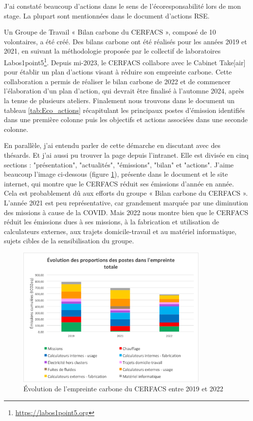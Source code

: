     J'ai constaté beaucoup d'actions dans le sens de l'écoresponsabilité lors de mon stage. La plupart sont mentionnées dans le document d'actions RSE.
    \vspace{0,5cm}

    Un Groupe de Travail « Bilan carbone du CERFACS », composé de 10 volontaires, a été créé. Des bilans carbone ont été réalisés pour les années 2019 et 2021, en suivant la méthodologie proposée par le collectif de laboratoires Labos1point5\footnote{\url{https://labos1point5.org}}. Depuis mi-2023, le CERFACS collabore avec le Cabinet Take[air] pour établir un plan d’actions visant à réduire son empreinte carbone. Cette collaboration a permis de réaliser le bilan carbone de 2022 et de commencer l'élaboration d'un plan d'action, qui devrait être finalisé à l’automne 2024, après la tenue de plusieurs ateliers. Finalement nous trouvons dans le document un tableau \ref{tab:Eco_actions} récapitulant les principaux postes d'émission identifiés dans une première colonne puis les objectifs et actions associées dans une seconde colonne.

    En parallèle, j'ai entendu parler de cette démarche en discutant avec des thésards. Et j'ai aussi pu trouver la page depuis l'intranet. Elle est divisée en cinq sections : "présentation", "actualités", "émissions", "bilan" et "actions".
    J'aime beaucoup l'image ci-dessous (figure \ref{fig:evolution_empreinte_carbone}), présente dans le document et le site internet, qui montre que le CERFACS réduit ses émissions d'année en année. Cela est probablement dû aux efforts du groupe « Bilan carbone du CERFACS ». L'année 2021 est peu représentative, car grandement marquée par une diminution des missions à cause de la COVID. Mais 2022 nous montre bien que le CERFACS réduit les émissions dues à ses missions, à la fabrication et utilisation de calculateurs externes, aux trajets domicile-travail et au matériel informatique, sujets cibles de la sensibilisation du groupe.

    \begin{figure}[H]
        \centering
        \includegraphics[width=0.85\textwidth]{images/evolution_postes_empreintecarbone.png}
        \caption{Évolution de l'empreinte carbone du CERFACS entre 2019 et 2022}
        \label{fig:evolution_empreinte_carbone}
    \end{figure}

